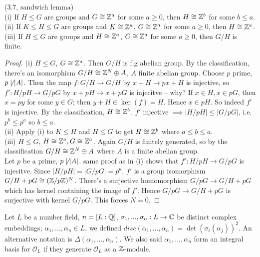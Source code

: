 \documentclass[a4paper]{article}
\begin{document}
\begin{lemma} (3.7, sandwich lemma)\\
(i) If $H \leq G$ are groups and $G \cong \mathbb{Z}^a$ for some $a \geq 0$, then $H \cong \mathbb{Z}^b$ for some $b \leq a$.\\
(ii) If $K \leq H \leq G$ are groups and $K \cong \mathbb{Z}^a$, $G \cong \mathbb{Z}^a$ for some $a \geq 0$, then $H \cong \mathbb{Z}^a$.\\
(iii) If $H \leq G$ are groups and $H \cong \mathbb{Z}^a$, $G \cong \mathbb{Z}^a$ for some $a \geq 0$, then $G/H$ is finite.
\begin{proof}
(i) $H \leq G$, $G \cong \mathbb{Z}^a$. Then $G/H$ is f.g abelian group. By the classification, there's an isomorphism $G/H \cong \mathbb{Z}^N \oplus A$, $A$ finite abelian group. Choose $p$ prime, $p \not\mid |A|$. Then the map $f:G/H \to G/H$ by $x+H \to px + H$ is injective, so $f':H/pH \to G/pG$ by $x+pH \to x+pG$ is injecitve -- why? If $x \in H, x \in pG$, then $x = py$ for some $y \in G$; then $y+H \in \ker(f) =H$. Hence $x \in pH$. So indeed $f'$ is injective. By the classification, $H \cong \mathbb{Z}^b$. $f'$ injective $\implies |H/pH| \leq |G/pG|$, i.e. $p^b \leq p^a$ so $b\leq a$.\\
(ii) Apply (i) to $K \leq H$ and $H \leq G$ to get $H \cong \mathbb{Z}^b$ where $a\leq b\leq a$.\\
(iii) $H \leq G$, $H \cong \mathbb{Z}^a, G \cong \mathbb{Z}^a$. Again $G/H$ is finitely generated, so by the classification $G/H \cong \mathbb{Z}^N \oplus A$ where $A$ is a finite abelian group.\\
Let $p$ be a prime, $p \not\mid |A|$. same proof as in (i) shows that $f':H/pH \to G/pG$ is injecitve. Since $|H/pH| = |G/pG| = p^a$, $f'$ is a group isomorphism $G/H + pG \cong (\mathbb{Z}/p\mathbb{Z})^N$. There's a surjective homomorphism $G/pG \to G/H+pG$ which has kernel containing the image of $f'$. Hence $G/pG \to G/H + pG$ is surjective with kernel $G/pG$. This forces $N=0$.
\end{proof}
\end{lemma}

Let $L$ be a number field, $n = [L:\mathbb{Q}]$, $\sigma_1,...,\sigma_n:L \to \mathbb{C}$ be distinct complex embeddings; $\alpha_1,...,\alpha_n \in L$, we defined $disc(\alpha_1,...,\alpha_n) = \det(\sigma_i(\alpha_j))^2$. An alternative notation is $\Delta(\alpha_1,...,\alpha_n)$. We also said $\alpha_1,...,\alpha_n$ form an integral basis for $\mathcal{O}_L$ if they generate $\mathcal{O}_L$ as a $\mathbb{Z}$-module.
\end{document}
